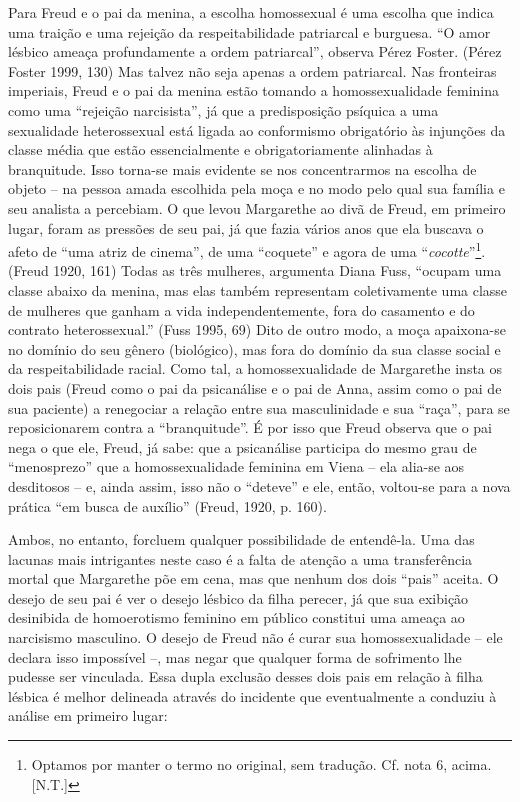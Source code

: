 Para Freud e o pai da menina, a escolha homossexual é uma escolha que
indica uma traição e uma rejeição da respeitabilidade patriarcal e
burguesa. ``O amor lésbico ameaça profundamente a ordem patriarcal'',
observa Pérez Foster. (Pérez Foster 1999, 130) Mas talvez não seja
apenas a ordem patriarcal. Nas fronteiras imperiais, Freud e o pai da
menina estão tomando a homossexualidade feminina como uma ``rejeição
narcisista'', já que a predisposição psíquica a uma sexualidade
heterossexual está ligada ao conformismo obrigatório às injunções da
classe média que estão essencialmente e obrigatoriamente alinhadas à
branquitude. Isso torna-se mais evidente se nos concentrarmos na escolha
de objeto -- na pessoa amada escolhida pela moça e no modo pelo qual sua
família e seu analista a percebiam. O que levou Margarethe ao divã de
Freud, em primeiro lugar, foram as pressões de seu pai, já que fazia
vários anos que ela buscava o afeto de ``uma atriz de cinema'', de uma
``coquete'' e agora de uma ``\emph{cocotte}''\footnote{Optamos por manter o
  termo no original, sem tradução. Cf. nota 6, acima. {[}N.T.{]}}.
(Freud 1920, 161) Todas as três mulheres, argumenta Diana Fuss, ``ocupam
uma classe abaixo da menina, mas elas também representam coletivamente
uma classe de mulheres que ganham a vida independentemente, fora do
casamento e do contrato heterossexual.'' (Fuss 1995, 69) Dito de outro
modo, a moça apaixona-se no domínio do seu gênero (biológico), mas fora
do domínio da sua classe social e da respeitabilidade racial. Como tal,
a homossexualidade de Margarethe insta os dois pais (Freud como o pai da
psicanálise e o pai de Anna, assim como o pai de sua paciente) a
renegociar a relação entre sua masculinidade e sua ``raça'', para se
reposicionarem contra a ``branquitude''. É por isso que Freud observa que
o pai nega o que ele, Freud, já sabe: que a psicanálise participa do
mesmo grau de ``menosprezo'' que a homossexualidade feminina em Viena --
ela alia-se aos desditosos -- e, ainda assim, isso não o ``deteve'' e
ele, então, voltou-se para a nova prática ``em busca de auxílio''
(Freud, 1920, p. 160).

Ambos, no entanto, forcluem qualquer possibilidade de entendê-la. Uma
das lacunas mais intrigantes neste caso é a falta de atenção a uma
transferência mortal que Margarethe põe em cena, mas que nenhum dos dois
``pais'' aceita. O desejo de seu pai é ver o desejo lésbico da filha
perecer, já que sua exibição desinibida de homoerotismo feminino em
público constitui uma ameaça ao narcisismo masculino. O desejo de Freud
não é curar sua homossexualidade -- ele declara isso impossível --, mas
negar que qualquer forma de sofrimento lhe pudesse ser vinculada. Essa
dupla exclusão desses dois pais em relação à filha lésbica é melhor
delineada através do incidente que eventualmente a conduziu à análise em
primeiro lugar:

